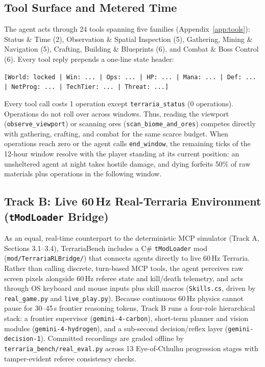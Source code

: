 \documentclass[10pt,letterpaper]{article}
\begin{document}
\subsection{Tool Surface and Metered Time}
The agent acts through 24 tools spanning five families (Appendix~\ref{app:tools}): Status \& Time (2), Observation \& Spatial Inspection (5), Gathering, Mining \& Navigation (5), Crafting, Building \& Blueprints (6), and Combat \& Boss Control (6). Every tool reply prepends a one-line state header:
\begin{center}
\small\texttt{[World: locked | Win: ... | Ops: ... | HP: ... | Mana: ... | Def: ... | NetProg: ... | TechTier: ... | Threat: ...]}
\end{center}
Every tool call costs 1 operation except \texttt{terraria\_status} (0 operations). Operations do not roll over across windows. Thus, reading the viewport (\texttt{observe\_viewport}) or scanning ores (\texttt{scan\_biome\_and\_ores}) competes directly with gathering, crafting, and combat for the same scarce budget. When operations reach zero or the agent calls \texttt{end\_window}, the remaining ticks of the 12-hour window resolve with the player standing at its current position: an unsheltered agent at night takes hostile damage, and dying forfeits 50\% of raw materials plus operations in the following window.

\subsection{Track B: Live 60\,Hz Real-Terraria Environment (\texttt{tModLoader} Bridge)}
As an equal, real-time counterpart to the deterministic MCP simulator (Track A, Sections 3.1--3.4), TerrariaBench includes a C\# \texttt{tModLoader} mod (\texttt{mod/TerrariaRLBridge/}) that connects agents directly to live 60\,Hz Terraria. Rather than calling discrete, turn-based MCP tools, the agent perceives raw screen pixels alongside 60\,Hz referee state and kill/death telemetry, and acts through OS keyboard and mouse inputs plus skill macros (\texttt{Skills.cs}, driven by \texttt{real\_game.py} and \texttt{live\_play.py}). Because continuous 60\,Hz physics cannot pause for 30--45\,s frontier reasoning tokens, Track B runs a four-role hierarchical stack: a frontier supervisor (\texttt{gemini-4-carbon}), short-term planner and vision modules (\texttt{gemini-4-hydrogen}), and a sub-second decision/reflex layer (\texttt{gemini-decision-1}). Committed recordings are graded offline by \texttt{terraria\_bench/real\_eval.py} across 13 Eye-of-Cthulhu progression stages with tamper-evident referee consistency checks.
\end{document}
